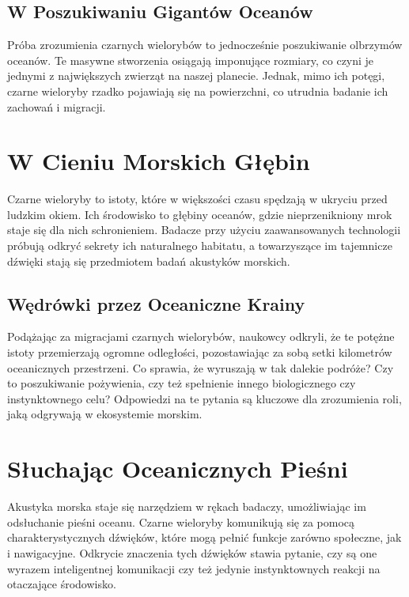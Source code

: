 \documentclass{article}
\begin{document}
\subsection{W Poszukiwaniu Gigantów Oceanów}
Próba zrozumienia czarnych wielorybów to jednocześnie poszukiwanie olbrzymów oceanów. Te masywne stworzenia osiągają imponujące rozmiary, co czyni je jednymi z największych zwierząt na naszej planecie. Jednak, mimo ich potęgi, czarne wieloryby rzadko pojawiają się na powierzchni, co utrudnia badanie ich zachowań i migracji.
\section{W Cieniu Morskich Głębin}
Czarne wieloryby to istoty, które w większości czasu spędzają w ukryciu przed ludzkim okiem. Ich środowisko to głębiny oceanów, gdzie nieprzenikniony mrok staje się dla nich schronieniem. Badacze przy użyciu zaawansowanych technologii próbują odkryć sekrety ich naturalnego habitatu, a towarzyszące im tajemnicze dźwięki stają się przedmiotem badań akustyków morskich.
\subsection{Wędrówki przez Oceaniczne Krainy}
Podążając za migracjami czarnych wielorybów, naukowcy odkryli, że te potężne istoty przemierzają ogromne odległości, pozostawiając za sobą setki kilometrów oceanicznych przestrzeni. Co sprawia, że wyruszają w tak dalekie podróże? Czy to poszukiwanie pożywienia, czy też spełnienie innego biologicznego czy instynktownego celu? Odpowiedzi na te pytania są kluczowe dla zrozumienia roli, jaką odgrywają w ekosystemie morskim.
\newpage
\section{Słuchając Oceanicznych Pieśni}
Akustyka morska staje się narzędziem w rękach badaczy, umożliwiając im odsłuchanie pieśni oceanu. Czarne wieloryby komunikują się za pomocą charakterystycznych dźwięków, które mogą pełnić funkcje zarówno społeczne, jak i nawigacyjne. Odkrycie znaczenia tych dźwięków stawia pytanie, czy są one wyrazem inteligentnej komunikacji czy też jedynie instynktownych reakcji na otaczające środowisko.
\end{document}
